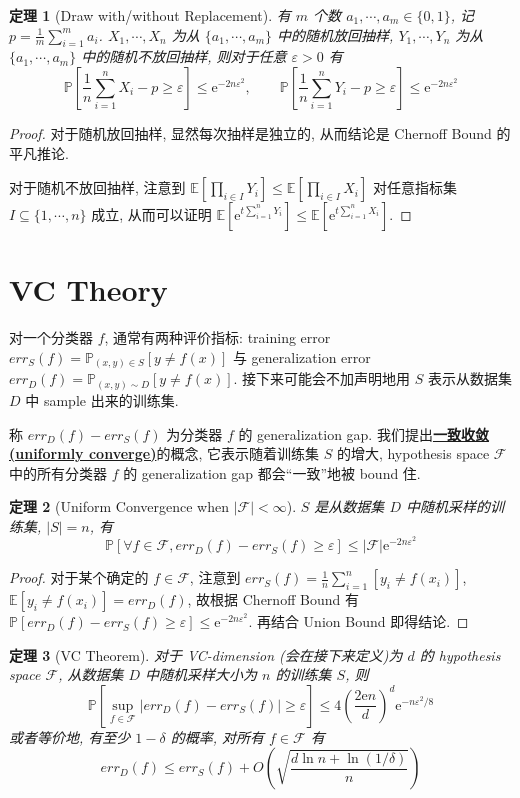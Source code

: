 \documentclass[8pt]{article}
\theoremstyle{compact}
\newtheorem{theorem}{定理}[section]
\def\obj#1{\textbf{\uline{#1}}}
\def\le{\leqslant}
\def\ge{\geqslant}
\def\P#1{\mathbb{P}\left[{#1}\right]}
\def\E#1{\mathbb{E}\left[{#1}\right]}
\def\e{\mathrm{e}}
\begin{document}
\begin{theorem}[Draw with/without Replacement]
	有 $m$ 个数 $a_1, \cdots, a_m \in \{0, 1\}$, 记 $p = \frac1m \sum\limits_{i=1}^{m}a_i$. $X_1, \cdots, X_n$ 为从 $\{a_1, \cdots, a_m\}$ 中的随机放回抽样, $Y_1, \cdots, Y_n$ 为从 $\{a_1, \cdots, a_m\}$ 中的随机不放回抽样, 则对于任意 $\varepsilon > 0$ 有
	$$\P{\frac1n \sum_{i=1}^{n}X_i - p \ge \varepsilon} \le \e^{-2n\varepsilon^2}, \qquad \P{\frac1n \sum_{i=1}^{n}Y_i - p \ge \varepsilon} \le \e^{-2n\varepsilon^2}$$
	\label{draw-w-replacement}
\end{theorem}
\begin{proof}
	对于随机放回抽样, 显然每次抽样是独立的, 从而结论是 Chernoff Bound 的平凡推论.

	对于随机不放回抽样, 注意到 $\E{\prod_{i \in I}Y_i} \le \E{\prod_{i \in I}X_i}$ 对任意指标集 $I \subseteq \{1, \cdots, n\}$ 成立, 从而可以证明 $\E{\e^{t\sum_{i=1}^nY_i}} \le \E{\e^{t\sum_{i=1}^nX_i}}$.
\end{proof}
\newpage
\section{VC Theory}
对一个分类器 $f$, 通常有两种评价指标: training error $err_S(f) = \mathbb P_{(x, y) \in S}[y \neq f(x)]$ 与 generalization error $err_D(f) = \mathbb P_{(x, y) \sim D}[y \neq f(x)]$. 接下来可能会不加声明地用 $S$ 表示从数据集 $D$ 中 sample 出来的训练集.

称 $err_D(f) - err_S(f)$ 为分类器 $f$ 的 generalization gap. 我们提出\obj{一致收敛(uniformly converge)}的概念, 它表示随着训练集 $S$ 的增大, hypothesis space $\mathcal F$ 中的所有分类器 $f$ 的 generalization gap 都会“一致”地被 bound 住.

\begin{theorem}[Uniform Convergence when $|\mathcal F| < \infty$]
	$S$ 是从数据集 $D$ 中随机采样的训练集, $|S| = n$, 有 $$\P{\forall f \in \mathcal F, err_D(f) - err_S(f) \ge \varepsilon} \le |\mathcal F|\e^{-2n\varepsilon^2}$$
\end{theorem}
\begin{proof}
	对于某个确定的 $f \in \mathcal F$, 注意到 $err_S(f) = \frac1n \sum_{i=1}^n[y_i \neq f(x_i)]$, $\E{y_i \neq f(x_i)} = err_D(f)$, 故根据 Chernoff Bound 有 $\P{err_D(f) - err_S(f) \ge \varepsilon} \le \e^{-2n\varepsilon^2}$. 再结合 Union Bound 即得结论.
\end{proof}
\begin{theorem}[VC Theorem]
	对于 VC-dimension (会在接下来定义)为 $d$ 的 hypothesis space $\mathcal F$, 从数据集 $D$ 中随机采样大小为 $n$ 的训练集 $S$, 则 $$\P{\sup_{f \in \mathcal F}|err_D(f) - err_S(f)| \ge \varepsilon} \le 4\left(\frac{2\e n}{d}\right)^d\e^{-n\varepsilon^2/8}$$ 或者等价地, 有至少 $1 - \delta$ 的概率, 对所有 $f \in \mathcal F$ 有 $$err_D(f) \le err_S(f) + O\left(\sqrt{\frac{d\ln n + \ln (1/\delta)}{n}}\right)$$
	\label{VC-theorem}
\end{theorem}
\end{document}
